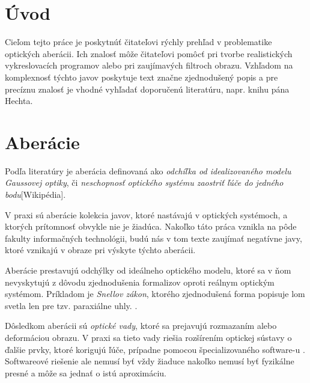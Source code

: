 \section{Úvod}
Cieľom tejto práce je poskytnúť čitateľovi rýchly prehľad v problematike optických aberácii.
Ich znalosť môže čitateľovi pomôcť pri tvorbe realistických vykreslovacích programov alebo
pri zaujímavých filtroch obrazu. Vzhľadom na komplexnosť týchto javov poskytuje text značne 
zjednodušený popis a pre precíznu znalosť je vhodné vyhľadať doporučenú literatúru, napr. knihu pána
Hechta\cite{hechtoptics}.

\section{Aberácie}
Podľa literatúry je aberácia definovaná ako \textit{odchíľka od idealizovaného modelu Gaussovej
optiky}\cite{hechtoptics}, či \textit{neschopnosť optického systému zaostriť ľúče do jedného bodu}[Wikipédia].

V praxi sú aberácie kolekcia javov, ktoré nastávajú v optických systémoch, a ktorých prítomnosť
obvykle nie je žiadúca. Nakoľko táto práca vznikla na pôde fakulty informačných technológii, budú
nás v tom texte zaujímať negatívne javy, ktoré vznikajú v obraze pri výskyte týchto aberácii.

Aberácie prestavujú odchýlky od ideálneho optického modelu, ktoré sa v ňom nevyskytujú z dôvodu
zjednodušenia formalizov oproti reálnym optickým systémom. Príkladom je \textit{Snellov zákon},
ktorého zjednodušená forma popisuje lom svetla len pre tzv. paraxiálne uhly. \cite{hechtoptics}.

Dôsledkom aberácii sú \textit{optické vady}, ktoré sa prejavujú rozmazaním alebo deformáciou obrazu. V praxi sa tieto
vady riešia rozšírením optickej sústavy o ďalšie prvky, ktoré korigujú ľúče, prípadne pomocou
špecializovaného software-u \cite{automaticRemovalCA}. Softwareové riešenie ale nemusí byť vždy žiaduce nakoľko nemusí
byť fyzikálne presné a môže sa jednať o istú aproximáciu.

